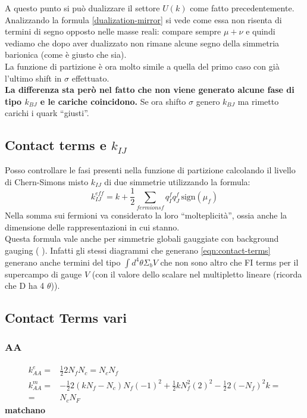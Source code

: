 \documentclass[a4paper,12pt]{article}
\newcommand{\sign}{\mbox{sign}}
\begin{document}
A questo punto si può dualizzare il settore $U(k)$ come fatto precedentemente.\\
Analizzando la formula \ref{dualization-mirror} si vede come essa non risenta di termini di segno opposto nelle masse reali: compare sempre $\mu + \nu$ e quindi vediamo che dopo aver dualizzato non rimane alcune segno della simmetria barionica (come è giusto che sia).\\
La funzione di partizione è ora molto simile a quella del primo caso con già l'ultimo shift in $\sigma$ effettuato. \\
\textbf{ La differenza sta però nel fatto che non viene generato alcune fase di tipo $k_{BJ}$ e le cariche coincidono.}
Se ora shifto $\sigma$ genero $k_{BJ}$ ma rimetto carichi i quark ``giusti''.

\subsection{Contact terms e $k_{IJ}$}
Posso controllare le fasi presenti nella funzione di partizione calcolando il livello di Chern-Simons misto $k_{IJ}$ di due simmetrie utilizzando la formula:
\begin{equation}
  k^{eff}_{IJ} = k + \frac{1}{2} \sum_{fermions f } q^f_I q^f_J \, \sign (\mu_{f})
  \label{eqn:contact-terms}
\end{equation}
Nella somma sui fermioni va considerato la loro ``molteplicità'', ossia anche la dimensione delle rappresentazioni in cui stanno.\\
Questa formula vale anche per simmetrie globali gauggiate con background gauging ( \citep{Aharony:1997bx}). Infatti gli stessi diagrammi che generano \ref{eqn:contact-terms} generano anche termini del tipo 
$
  \int d^4 \theta \Sigma_b V 
$
che non sono altro che FI terms per il supercampo di gauge $V$ (con il valore dello scalare nel multipletto lineare (ricorda che D ha 4 $\theta$)).




 \subsection*{Contact Terms vari}
 \subsubsection*{ AA }
  \begin{align*}
    k^e_{AA} =& \frac{1}{2}  2 N_f N_c =  N_c N_f\\
    k^m_{AA} =& - \frac{1}{2}  2  (k N_f - N_c) N_f (-1)^2  + \frac{1}{2} k N_f^2 (2)^2 - \frac{1}{2} 2 (- N_f)^2 k = \\
	   =& N_c N_F 
  \end{align*}
  \textbf{matchano} 
\end{document}
